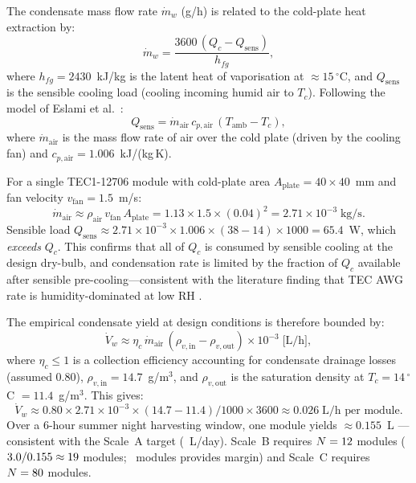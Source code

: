 \documentclass[12pt,a4paper]{report}   %
\begin{document}
The condensate mass flow rate $\dot{m}_w$ (g/h) is related to the cold-plate heat extraction by:
\begin{equation}
  \dot{m}_w = \frac{3600\,(Q_c - Q_{\mathrm{sens}})}{h_{fg}},
  \label{eq:mdot}
\end{equation}
where $h_{fg} = 2430$~kJ/kg is the latent heat of vaporisation at $\approx 15\,^\circ$C,
and $Q_{\mathrm{sens}}$ is the sensible cooling load (cooling incoming humid air to $T_c$).
Following the model of Eslami et al.\ \cite{eslami2021tec}:
\begin{equation}
  Q_{\mathrm{sens}} = \dot{m}_{\mathrm{air}}\,c_{p,\mathrm{air}}\,(T_{\mathrm{amb}} - T_c),
\end{equation}
where $\dot{m}_{\mathrm{air}}$ is the mass flow rate of air over the cold plate (driven by the
cooling fan) and $c_{p,\mathrm{air}} = 1.006$~kJ/(kg\,K).

For a single TEC1-12706 module with cold-plate area $A_{\mathrm{plate}} = 40 \times 40$~mm and
fan velocity $v_{\mathrm{fan}} = 1.5$~m/s:
\begin{equation*}
  \dot{m}_{\mathrm{air}} \approx \rho_{\mathrm{air}}\,v_{\mathrm{fan}}\,A_{\mathrm{plate}}
  = 1.13 \times 1.5 \times (0.04)^2 = 2.71 \times 10^{-3}\;\text{kg/s}.
\end{equation*}
Sensible load $Q_{\mathrm{sens}} \approx 2.71\times10^{-3} \times 1.006 \times (38-14)
\times 1000 = 65.4$~W, which \emph{exceeds} $Q_c$. This confirms that all of $Q_c$ is consumed
by sensible cooling at the design dry-bulb, and condensation rate is limited by the fraction of
$Q_c$ available after sensible pre-cooling---consistent with the literature finding that TEC AWG
rate is humidity-dominated at low RH \cite{shourideh2021tec}.

The empirical condensate yield at design conditions is therefore bounded by:
\begin{equation}
  \dot{V}_w \approx \eta_c\,\dot{m}_{\mathrm{air}}\,(\rho_{v,\mathrm{in}} - \rho_{v,\mathrm{out}})\times 10^{-3}
  \;\text{[L/h]},
  \label{eq:Vw}
\end{equation}
where $\eta_c \leq 1$ is a collection efficiency accounting for condensate drainage losses
(assumed 0.80), $\rho_{v,\mathrm{in}} = 14.7$~g/m$^3$, and $\rho_{v,\mathrm{out}}$ is the
saturation density at $T_c = 14\,^\circ$C $= 11.4$~g/m$^3$. This gives:
\begin{equation*}
  \dot{V}_w \approx 0.80 \times 2.71\times10^{-3} \times (14.7 - 11.4) / 1000 \times 3600
  \approx 0.026\;\text{L/h per module}.
\end{equation*}
Over a 6-hour summer night harvesting window, one module yields $\approx 0.155$~L --- consistent
with the Scale~A target (\ScaleAWaterDay~L/day). Scale~B requires $N = 12$ modules
($3.0 / 0.155 \approx 19$ modules; \ScaleBTECn~modules provides margin) and
Scale~C requires $N = 80$ modules.
\end{document}
